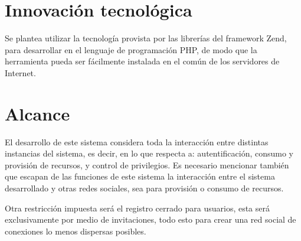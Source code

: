 \section{Innovación tecnológica}
Se plantea utilizar la tecnología provista por las librerías del framework
Zend, para desarrollar en el lenguaje de programación PHP, de modo que la
herramienta pueda ser fácilmente instalada en el común de los servidores de
Internet.

\section{Alcance}
El desarrollo de este sistema considera toda la interacción entre distintas
instancias del sistema, es decir, en lo que respecta a: autentificación,
consumo y provisión de recursos, y control de privilegios. Es necesario
mencionar también que escapan de las funciones de este sistema la interacción
entre el sistema desarrollado y otras redes sociales, sea para provisión o
consumo de recursos.

Otra restricción impuesta será el registro cerrado para usuarios, esta será
exclusivamente por medio de invitaciones, todo esto para crear una red social
de conexiones lo menos dispersas posibles.

